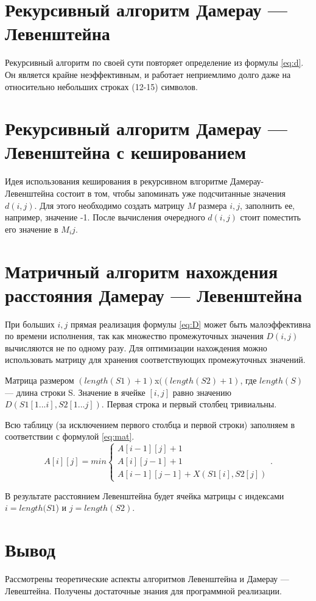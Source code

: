 \section{Рекурсивный алгоритм Дамерау — Левенштейна}


Рекурсивный алгоритм по своей сути повторяет определение из формулы \ref{eq:d}. Он является крайне неэффективным, и работает неприемлимо долго даже на относительно небольших строках (12-15) символов.


\section{Рекурсивный алгоритм Дамерау — Левенштейна с кешированием}

Идея использования кеширования в рекурсивном влгоритме Дамерау-Левенштейна состоит в том, чтобы запоминать уже подсчитанные значения $d(i, j)$. Для этого необходимо создать матрицу $M$ размера $i, j$, заполнить ее, например, значение -1. После вычисления очередного $d(i, j)$ стоит поместить его значение в  $M_ij$.


\section{Матричный алгоритм нахождения расстояния Дамерау — Левенштейна}

При больших $i, j$ прямая реализация формулы \ref{eq:D} может быть малоэффективна по времени исполнения, так как множество промежуточных значения $ D(i, j)$ вычисляются не по одному разу. Для оптимизации нахождения можно использовать матрицу для хранения соответствующих промежуточных значений.

Матрица размером $(length(S1)+ 1)$x$((length(S2) + 1)$, где $length(S)$ — длина строки S. Значение в ячейке $[i, j]$ равно значению $D(S1[1...i], S2[1...j])$. Первая строка и первый столбец тривиальны. 

Всю таблицу (за исключением первого столбца и первой строки) заполняем в соответствии с формулой \ref{eq:mat}.
\begin{equation}
	\label{eq:mat}
	A[i][j] = min \begin{cases}
		A[i-1][j] + 1\\
		A[i][j-1] + 1\\
		A[i-1][j-1] + X(S1[i], S2[j])
	\end{cases}.
\end{equation}

В результате расстоянием Левенштейна будет ячейка матрицы с индексами $i = length(S1$) и $j = length(S2)$.


\section*{Вывод}

Рассмотрены теоретические аспекты алгоритмов Левенштейна и Дамерау — Левештейна. Получены достаточные знания для программной реализации.

\clearpage